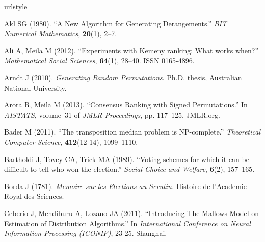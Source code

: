 \documentclass[article,nojss]{jss}
\begin{document}
%
%
\begin{thebibliography}{36}
\newcommand{\enquote}[1]{``#1''}
\providecommand{\natexlab}[1]{#1}
\providecommand{\url}[1]{\texttt{#1}}
\providecommand{\urlprefix}{URL }
\expandafter\ifx\csname urlstyle\endcsname\relax
  \providecommand{\doi}[1]{doi:\discretionary{}{}{}#1}\else
  \providecommand{\doi}{doi:\discretionary{}{}{}\begingroup
  \urlstyle{rm}\Url}\fi
\providecommand{\eprint}[2][]{\url{#2}}

Akl SG (1980).
\newblock \enquote{{A New Algorithm for Generating Derangements}.}
\newblock \emph{BIT Numerical Mathematics}, \textbf{20}(1), 2--7.

Ali A, Meila M (2012).
\newblock \enquote{{Experiments with Kemeny ranking: What works when?}}
\newblock \emph{Mathematical Social Sciences}, \textbf{64}(1), 28--40.
\newblock ISSN 0165-4896.

Arndt J (2010).
\newblock \emph{{Generating Random Permutations}}.
\newblock Ph.D. thesis, Australian National University.

Arora R, Meila M (2013).
\newblock \enquote{{Consensus Ranking with Signed Permutations}.}
\newblock In \emph{AISTATS}, volume~31 of \emph{JMLR Proceedings}, pp.
  117--125. JMLR.org.

Bader M (2011).
\newblock \enquote{{The transposition median problem is NP-complete.}}
\newblock \emph{Theoretical Computer Science}, \textbf{412}(12-14), 1099--1110.

Bartholdi J, Tovey CA, Trick MA (1989).
\newblock \enquote{{Voting schemes for which it can be difficult to tell who
  won the election}.}
\newblock \emph{Social Choice and Welfare}, \textbf{6}(2), 157--165.

Borda J (1781).
\newblock \emph{{Memoire sur les Elections au Scrutin.}}
\newblock Histoire de l'Academie Royal des Sciences.

Ceberio J, Mendiburu A, Lozano JA (2011).
\newblock \enquote{{Introducing The Mallows Model on Estimation of Distribution
  Algorithms}.}
\newblock In \emph{International Conference on Neural Information Processing
  (ICONIP)}, 23-25. Shanghai.


\end{thebibliography}
\end{document}
